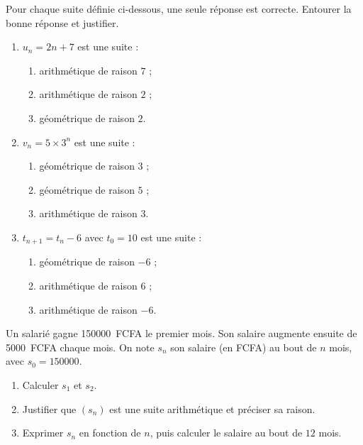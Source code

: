\documentclass[11pt]{article}
\begin{document}
\begin{exercice}
Pour chaque suite définie ci-dessous, une seule réponse est correcte. Entourer la bonne réponse et justifier.
\begin{enumerate}
\item $u_n = 2n + 7$ est une suite :
\begin{enumerate}
\item[a)] arithmétique de raison $7$ ;
\item[b)] arithmétique de raison $2$ ;
\item[c)] géométrique de raison $2$.
\end{enumerate}
\item $v_n = 5 \times 3^{n}$ est une suite :
\begin{enumerate}
\item[a)] géométrique de raison $3$ ;
\item[b)] géométrique de raison $5$ ;
\item[c)] arithmétique de raison $3$.
\end{enumerate}
\item $t_{n+1} = t_n - 6$ avec $t_0 = 10$ est une suite :
\begin{enumerate}
\item[a)] géométrique de raison $-6$ ;
\item[b)] arithmétique de raison $6$ ;
\item[c)] arithmétique de raison $-6$.
\end{enumerate}
\end{enumerate}
\end{exercice}

\begin{exercice}
Un salarié gagne \SI{150000}{FCFA} le premier mois. Son salaire augmente ensuite de \SI{5000}{FCFA} chaque mois. On note $s_n$ son salaire (en FCFA) au bout de $n$ mois, avec $s_0 = 150000$.
\begin{enumerate}
\item Calculer $s_1$ et $s_2$.
\item Justifier que $(s_n)$ est une suite arithmétique et préciser sa raison.
\item Exprimer $s_n$ en fonction de $n$, puis calculer le salaire au bout de $12$ mois.
\end{enumerate}
\end{exercice}
\end{document}
